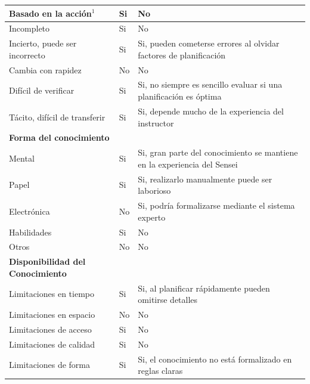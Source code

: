 \documentclass[12pt,a4paper,twoside,spanish]{article}      %
\newcommand{\PreserveBackslash}[1]{\let\temp=\\#1\let\\=\temp}
\let\PBS=\PreserveBackslash
\begin{document}
\begin{table}[H]
\begin{tabularx}{\textwidth}{|p{5cm}|>{\PBS\raggedright}p{0.8cm}|X|}
                Basado en la acción$^1$& Si & No\\ \hline

                Incompleto& Si & No\\\hline 

                Incierto, puede ser incorrecto & Si & Si, pueden cometerse errores al olvidar factores de planificación \\ \hline 

                Cambia con rapidez& No  & No\\ \hline 

                Difícil de verificar& Si & Si, no siempre es sencillo evaluar si una planificación es óptima \\ \hline 

                Tácito, difícil de transferir& Si & Si, depende mucho de la experiencia del instructor \\ \hline 

                \textbf{Forma del conocimiento} & &\\ \hline

                Mental& Si & Si, gran parte del conocimiento se mantiene en la experiencia del Sensei \\ \hline

                Papel& Si & Si, realizarlo manualmente puede ser laborioso \\ \hline 

                Electrónica& No  & Si, podría formalizarse mediante el sistema experto \\ \hline

                Habilidades&Si  & No\\ \hline 

                Otros& No & No\\ \hline 

                \textbf{Disponibilidad del Conocimiento} &  &\\ \hline 

                Limitaciones en tiempo& Si  & Si, al planificar rápidamente pueden omitirse detalles \\ \hline

                Limitaciones en espacio& No & No \\ \hline 

                Limitaciones de acceso& Si & No \\ \hline 

                Limitaciones de calidad& Si & No \\ \hline 

                Limitaciones de forma& Si & Si, el conocimiento no está formalizado en reglas claras \\ \hline

            \end{tabularx}
            \label{tab.TM2}
        \end{table}
\end{document}
